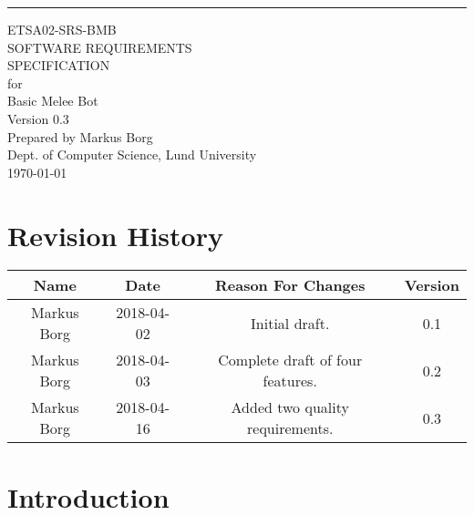 \documentclass{scrreprt}
\date{}
\def\myversion{0.3 }
\begin{document}
\begin{flushright}
    \rule{16cm}{5pt}\vskip1cm
    \begin{bfseries}
    	\LARGE{ETSA02-SRS-BMB}\\
    	\vspace{1.5cm}
        \Huge{SOFTWARE REQUIREMENTS\\ SPECIFICATION}\\
        \vspace{0.5cm}
        for\\
        \vspace{0.5cm}
        Basic Melee Bot\\
        \vspace{1.5cm}
        \LARGE{Version \myversion}\\
        \vspace{1.5cm}
        Prepared by Markus Borg\\
        Dept. of Computer Science, Lund University\\
        \vspace{1.5cm}
        \today\\
    \end{bfseries}
\end{flushright}

\tableofcontents


\chapter*{Revision History}

\begin{center}
    \begin{tabular}{|c|c|c|c|}
        \hline
	    Name & Date & Reason For Changes & Version\\
        \hline
	    Markus Borg & 2018-04-02 & Initial draft. & 0.1\\
        \hline
        Markus Borg & 2018-04-03 & Complete draft of four features. & 0.2\\
        \hline
        Markus Borg & 2018-04-16 & Added two quality requirements. & 0.3\\
        \hline
    \end{tabular}
\end{center}

\chapter{Introduction}
\end{document}
